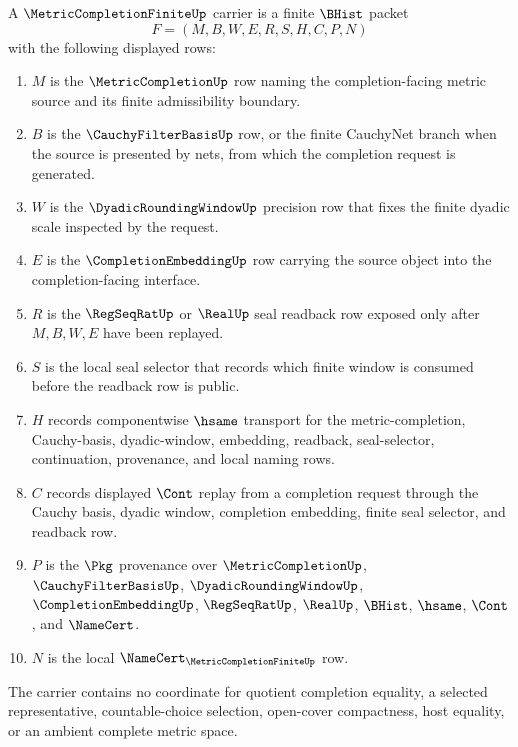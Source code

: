 \begin{definition}
\label{def:metric-completion-finite-carrier}
A $\MetricCompletionFiniteUp$ carrier is a finite $\BHist$ packet
$$
F=(M,B,W,E,R,S,H,C,P,N)
$$
with the following displayed rows:
\begin{enumerate}
\item $M$ is the $\MetricCompletionUp$ row naming the completion-facing metric source and its finite admissibility boundary.
\item $B$ is the $\CauchyFilterBasisUp$ row, or the finite CauchyNet branch when the source is presented by nets, from which the completion request is generated.
\item $W$ is the $\DyadicRoundingWindowUp$ precision row that fixes the finite dyadic scale inspected by the request.
\item $E$ is the $\CompletionEmbeddingUp$ row carrying the source object into the completion-facing interface.
\item $R$ is the $\RegSeqRatUp$ or $\RealUp$ seal readback row exposed only after $M,B,W,E$ have been replayed.
\item $S$ is the local seal selector that records which finite window is consumed before the readback row is public.
\item $H$ records componentwise $\hsame$ transport for the metric-completion, Cauchy-basis, dyadic-window, embedding, readback, seal-selector, continuation, provenance, and local naming rows.
\item $C$ records displayed $\Cont$ replay from a completion request through the Cauchy basis, dyadic window, completion embedding, finite seal selector, and readback row.
\item $P$ is the $\Pkg$ provenance over $\MetricCompletionUp$, $\CauchyFilterBasisUp$, $\DyadicRoundingWindowUp$, $\CompletionEmbeddingUp$, $\RegSeqRatUp$, $\RealUp$, $\BHist$, $\hsame$, $\Cont$, and $\NameCert$.
\item $N$ is the local $\NameCert_{\MetricCompletionFiniteUp}$ row.
\end{enumerate}
The carrier contains no coordinate for quotient completion equality, a selected representative, countable-choice selection, open-cover compactness, host equality, or an ambient complete metric space.
\end{definition}


